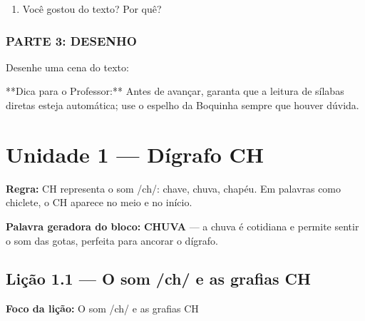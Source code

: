 \begin{exercicio}
\begin{enumerate}
  \item Você gostou do texto? Por quê?
  \begin{center}
  \underline{\hspace{12cm}}
  \end{center}

\end{enumerate}

\subsection*{PARTE 3: DESENHO}

Desenhe uma cena do texto:

\begin{center}
\end{center}

\end{exercicio}

\begin{dica}
**Dica para o Professor:** Antes de avançar, garanta que a leitura de sílabas diretas esteja automática; use o espelho da Boquinha sempre que houver dúvida.
\end{dica}


\chapter{Unidade 1 --- Dígrafo CH}


\textbf{Regra:} CH representa o som /ch/: chave, chuva, chapéu. Em palavras como chiclete, o CH aparece no meio e no início.

\textbf{Palavra geradora do bloco:} \textbf{CHUVA} --- a chuva é cotidiana e permite sentir o som das gotas, perfeita para ancorar o dígrafo.

\section{Lição 1.1 --- O som /ch/ e as grafias CH}

\textbf{Foco da lição:} O som /ch/ e as grafias CH


